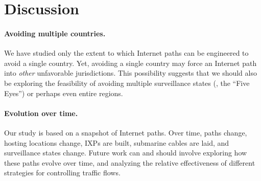\section{Discussion}
\label{discussion}

\paragraph{Avoiding multiple countries.} 
We have studied only the extent to which Internet paths can be
engineered to avoid a {single} country.  Yet, avoiding a single country
may force an Internet path into {\em other} unfavorable
jurisdictions. This possibility suggests that we should also be
exploring the feasibility of avoiding multiple surveillance states (\eg,
the ``Five Eyes'') or perhaps even entire regions. 

\paragraph{Evolution over time.}
Our study is based on a snapshot of Internet paths. Over time, paths
change, hosting locations change, IXPs are built, submarine cables are
laid, and surveillance states change.  Future work can and should
involve exploring how these paths evolve over time, and analyzing the
relative effectiveness of different strategies for controlling traffic flows.


